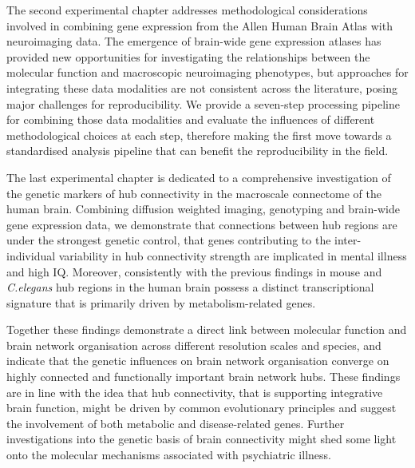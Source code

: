 The second experimental chapter addresses methodological considerations involved in combining gene expression from the Allen Human Brain Atlas with neuroimaging data. The emergence of brain-wide gene expression atlases has provided new opportunities for investigating the relationships between the molecular function and macroscopic neuroimaging phenotypes, but approaches for integrating these data modalities are not consistent across the literature, posing major challenges for reproducibility. We provide a seven-step processing pipeline for combining those data modalities and evaluate the influences of different methodological choices at each step, therefore making the first move towards a standardised analysis pipeline that can benefit the reproducibility in the field.

The last experimental chapter is dedicated to a comprehensive investigation of the genetic markers of hub connectivity in the macroscale connectome of the human brain. Combining diffusion weighted imaging, genotyping and brain-wide gene expression data, we demonstrate that connections between hub regions are under the strongest genetic control, that genes contributing to the inter-individual variability in hub connectivity strength are implicated in mental illness and high IQ. Moreover, consistently with the previous findings in mouse and \textit{C.elegans} hub regions in the human brain possess a distinct transcriptional signature that is primarily driven by metabolism-related genes.

Together these findings demonstrate a direct link between molecular function and brain network organisation across different resolution scales and species, and indicate that the genetic influences on brain network organisation converge on highly connected and functionally important brain network hubs. These findings are in line with the idea that hub connectivity, that is supporting integrative brain function, might be driven by common evolutionary principles and suggest the involvement of both metabolic and disease-related genes. Further investigations into the genetic basis of brain connectivity might shed some light onto the molecular mechanisms associated with psychiatric illness.
